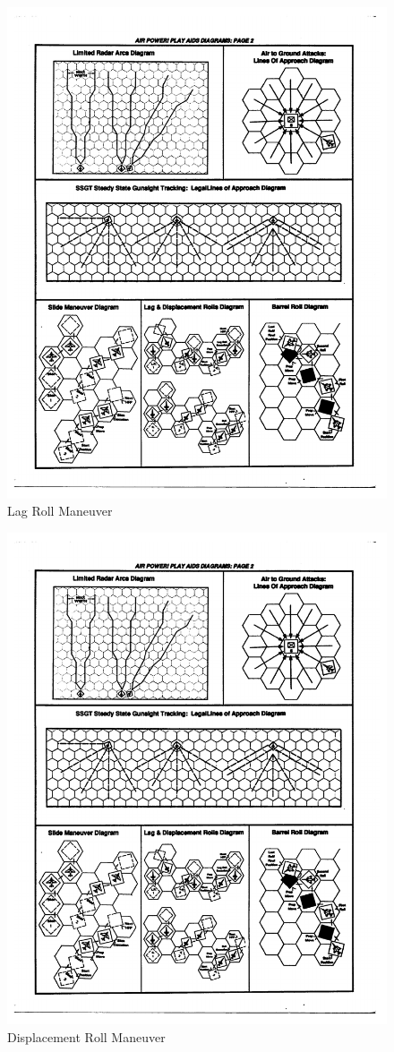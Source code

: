 \documentclass[10pt]{article}
\begin{document}
\begin{figure}
\centering
\caption{Lag Roll Maneuver}
\medskip
\includegraphics[width=0.8\linewidth]{figures/aids-lag-roll.pdf}
\end{figure}

\begin{figure}
\centering
\caption{Displacement Roll Maneuver}
\medskip
\includegraphics[width=0.8\linewidth]{figures/aids-displacement-roll.pdf}
\end{figure}
\end{document}
